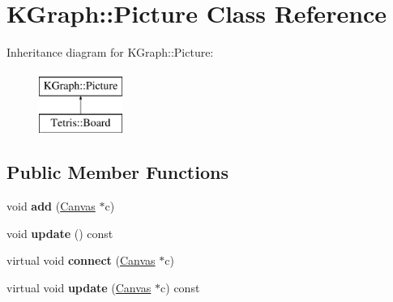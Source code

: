 \hypertarget{class_k_graph_1_1_picture}{\section{K\-Graph\-:\-:Picture Class Reference}
\label{class_k_graph_1_1_picture}
}
Inheritance diagram for K\-Graph\-:\-:Picture\-:\begin{figure}[H]
\begin{center}
\leavevmode
\includegraphics[height=2.000000cm]{class_k_graph_1_1_picture}
\end{center}
\end{figure}
\subsection*{Public Member Functions}
\begin{DoxyCompactItemize}
\item 
\hypertarget{class_k_graph_1_1_picture_a62c483ebdc92a21f0471b815abd95a5c}{void {\bfseries add} (\hyperlink{class_k_graph_1_1_canvas}{Canvas} $\ast$c)}\label{class_k_graph_1_1_picture_a62c483ebdc92a21f0471b815abd95a5c}

\item 
\hypertarget{class_k_graph_1_1_picture_ac6a78e02007c853c4b72ea69b1d8b083}{void {\bfseries update} () const }\label{class_k_graph_1_1_picture_ac6a78e02007c853c4b72ea69b1d8b083}

\item 
\hypertarget{class_k_graph_1_1_picture_ade43b95aa8432929c790bfab6360648c}{virtual void {\bfseries connect} (\hyperlink{class_k_graph_1_1_canvas}{Canvas} $\ast$c)}\label{class_k_graph_1_1_picture_ade43b95aa8432929c790bfab6360648c}

\item 
\hypertarget{class_k_graph_1_1_picture_a9776832c379d30aa59863690c361b1f5}{virtual void {\bfseries update} (\hyperlink{class_k_graph_1_1_canvas}{Canvas} $\ast$c) const }\label{class_k_graph_1_1_picture_a9776832c379d30aa59863690c361b1f5}

\end{DoxyCompactItemize}
